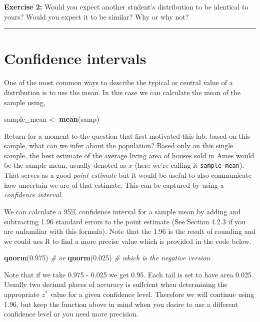 \documentclass[]{book}
\newenvironment{Shaded}{\begin{snugshade}}{\end{snugshade}}
\newcommand{\KeywordTok}[1]{\textcolor[rgb]{0.13,0.29,0.53}{\textbf{{#1}}}}
\newcommand{\FloatTok}[1]{\textcolor[rgb]{0.00,0.00,0.81}{{#1}}}
\newcommand{\StringTok}[1]{\textcolor[rgb]{0.31,0.60,0.02}{{#1}}}
\newcommand{\CommentTok}[1]{\textcolor[rgb]{0.56,0.35,0.01}{\textit{{#1}}}}
\newcommand{\NormalTok}[1]{{#1}}
\theoremstyle{definition}
\theoremstyle{definition}
\theoremstyle{definition}
\theoremstyle{remark}
\begin{document}
\textbf{Exercise 2:} Would you expect another student's distribution to
be identical to yours? Would you expect it to be similar? Why or why
not?

\begin{center}\rule{0.5\linewidth}{\linethickness}\end{center}

\section{Confidence intervals}\label{confidence-intervals}

One of the most common ways to describe the typical or central value of
a distribution is to use the mean. In this case we can calculate the
mean of the sample using,

\begin{Shaded}
\begin{Highlighting}[]
\NormalTok{sample_mean <-}\StringTok{ }\KeywordTok{mean}\NormalTok{(samp)}
\end{Highlighting}
\end{Shaded}

Return for a moment to the question that first motivated this lab: based
on this sample, what can we infer about the population? Based only on
this single sample, the best estimate of the average living area of
houses sold in Ames would be the sample mean, usually denoted as
\(\bar{x}\) (here we're calling it \texttt{sample\_mean}). That serves
as a good \emph{point estimate} but it would be useful to also
communicate how uncertain we are of that estimate. This can be captured
by using a \emph{confidence interval}.

We can calculate a 95\% confidence interval for a sample mean by adding
and subtracting 1.96 standard errors to the point estimate (See Section
4.2.3 if you are unfamiliar with this formula). Note that the 1.96 is
the result of rounding and we could ues R to find a more precise value
which is provided in the code below.

\begin{Shaded}
\begin{Highlighting}[]
\KeywordTok{qnorm}\NormalTok{(}\FloatTok{0.975}\NormalTok{) }\CommentTok{# or}
\KeywordTok{qnorm}\NormalTok{(}\FloatTok{0.025}\NormalTok{) }\CommentTok{# which is the negative version}
\end{Highlighting}
\end{Shaded}

Note that if we take 0.975 - 0.025 we get 0.95. Each tail is set to have
area 0.025. Usually two decimal places of accuracy is suffcient when
determining the appropriate \(z^*\) value for a given confidence level.
Therefore we will continue using 1.96, but keep the function above in
mind when you desire to use a different confidence level or you need
more precision.
\end{document}
